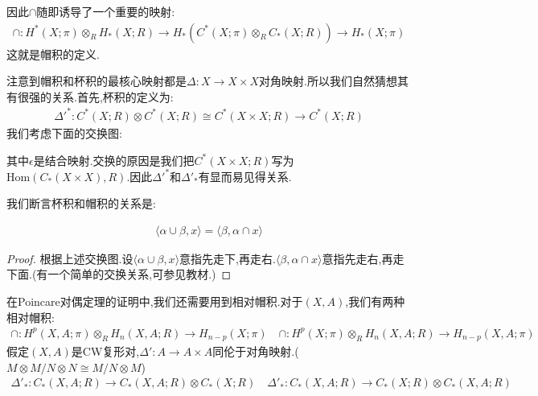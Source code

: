因此$\cap$随即诱导了一个重要的映射:
\begin{align*}
    \cap: H^*(X;\pi) \otimes_R H_*(X;R) \rightarrow H_*(C^*(X;\pi)\otimes_R C_*(X;R)) \to H_*(X;\pi)
\end{align*}
这就是帽积的定义.

注意到帽积和杯积的最核心映射都是$\Delta:X \to X\times X$对角映射.所以我们自然猜想其有很强的关系.首先,杯积的定义为:
\begin{align*}
    \Delta'^*:C^*(X;R)\otimes C^*(X;R) \cong C^*(X \times X;R)\to C^*(X;R)
\end{align*}
我们考虑下面的交换图:

其中$\epsilon$是结合映射.交换的原因是我们把$C^*(X\times X;R)$写为$\mathrm{Hom}(C_*(X \times X),R)$.因此$\Delta'^*$和$\Delta'_*$有显而易见得关系.

我们断言杯积和帽积的关系是:
\begin{proposition}[基本恒等式]
    \begin{align*}
        \langle \alpha \cup \beta,x\rangle=\langle \beta,\alpha \cap x\rangle
    \end{align*}
\end{proposition}
\begin{proof}
    根据上述交换图.设$\langle \alpha \cup \beta,x\rangle$意指先走下,再走右.$\langle \beta,\alpha \cap x\rangle$意指先走右,再走下面.(有一个简单的交换关系,可参见教材.)
\end{proof}
在Poincare对偶定理的证明中,我们还需要用到相对帽积.对于$(X,A)$,我们有两种相对帽积:
\begin{align*}
     \cap: H^p(X,A;\pi) \otimes_R H_n(X,A;R) \to H_{n-p}(X;\pi)\quad \cap: H^p(X;\pi) \otimes_R H_n(X,A;R) \to H_{n-p}(X,A;\pi)
\end{align*}
假定$(X,A)$是CW复形对,$\Delta':A \to A \times A$同伦于对角映射.($M\otimes M /N \otimes N\cong M/N \otimes M$)
\begin{align*}
    \Delta'_*:C_*(X,A;R) \to C_*(X,A;R)\otimes C_*(X;R) \quad \Delta'_*:C_*(X,A;R) \to C_*(X;R)\otimes C_*(X,A;R)
\end{align*}

